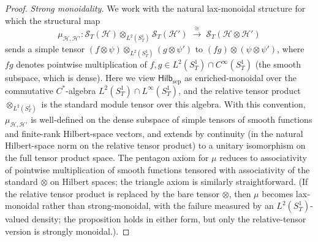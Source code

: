 \documentclass[12pt]{article}
\theoremstyle{definition}
\theoremstyle{remark}
\newcommand{\Hcal}{\mathcal{H}}
\newcommand{\Hilb}{\mathsf{Hilb}}
\begin{document}
\begin{proof}
\emph{Strong monoidality.} We work with the natural lax-monoidal structure for which the structural map
\begin{equation*}
\mu_{\Hcal,\Hcal'}\colon \mathcal{S}_T(\Hcal)\otimes_{L^2(S^1_T)}\mathcal{S}_T(\Hcal')\;\xrightarrow{\;\cong\;}\;\mathcal{S}_T(\Hcal\otimes\Hcal')
\end{equation*}
sends a simple tensor $(f\otimes\psi)\otimes_{L^2(S^1_T)}(g\otimes\psi')$ to $(fg)\otimes(\psi\otimes\psi')$, where $fg$ denotes pointwise multiplication of $f,g\in L^2(S^1_T)\cap C^\infty(S^1_T)$ (the smooth subspace, which is dense). Here we view $\Hilb_{\mathrm{sep}}$ as enriched-monoidal over the commutative $C^*$-algebra $L^2(S^1_T)\cap L^\infty(S^1_T)$, and the relative tensor product $\otimes_{L^2(S^1_T)}$ is the standard module tensor over this algebra. With this convention, $\mu_{\Hcal,\Hcal'}$ is well-defined on the dense subspace of simple tensors of smooth functions and finite-rank Hilbert-space vectors, and extends by continuity (in the natural Hilbert-space norm on the relative tensor product) to a unitary isomorphism on the full tensor product space. The pentagon axiom for $\mu$ reduces to associativity of pointwise multiplication of smooth functions tensored with associativity of the standard $\otimes$ on Hilbert spaces; the triangle axiom is similarly straightforward. (If the relative tensor product is replaced by the bare tensor $\otimes$, then $\mu$ becomes lax-monoidal rather than strong-monoidal, with the failure measured by an $L^2(S^1_T)$-valued density; the proposition holds in either form, but only the relative-tensor version is strongly monoidal.).


\end{proof}
\end{document}
